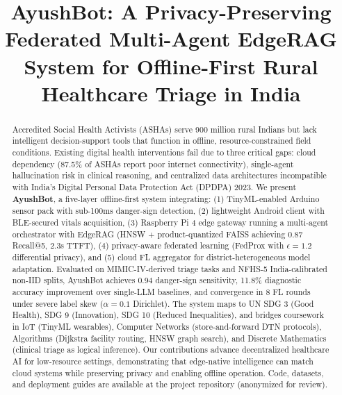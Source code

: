 \documentclass[conference,compsoc]{IEEEtran}
\begin{document}
\title{AyushBot: A Privacy-Preserving Federated Multi-Agent EdgeRAG System for Offline-First Rural Healthcare Triage in India}

\author{
}

\maketitle

\begin{abstract}
Accredited Social Health Activists (ASHAs) serve 900 million rural Indians but lack intelligent decision-support tools that function in offline, resource-constrained field conditions. Existing digital health interventions fail due to three critical gaps: cloud dependency (87.5\% of ASHAs report poor internet connectivity), single-agent hallucination risk in clinical reasoning, and centralized data architectures incompatible with India's Digital Personal Data Protection Act (DPDPA) 2023. We present \textbf{AyushBot}, a five-layer offline-first system integrating: (1) TinyML-enabled Arduino sensor pack with sub-100ms danger-sign detection, (2) lightweight Android client with BLE-secured vitals acquisition, (3) Raspberry Pi 4 edge gateway running a multi-agent orchestrator with EdgeRAG (HNSW + product-quantized FAISS achieving 0.87 Recall@5, 2.3s TTFT), (4) privacy-aware federated learning (FedProx with \(\epsilon = 1.2\) differential privacy), and (5) cloud FL aggregator for district-heterogeneous model adaptation. Evaluated on MIMIC-IV-derived triage tasks and NFHS-5 India-calibrated non-IID splits, AyushBot achieves 0.94 danger-sign sensitivity, 11.8\% diagnostic accuracy improvement over single-LLM baselines, and convergence in 8 FL rounds under severe label skew (\(\alpha = 0.1\) Dirichlet). The system maps to UN SDG 3 (Good Health), SDG 9 (Innovation), SDG 10 (Reduced Inequalities), and bridges coursework in IoT (TinyML wearables), Computer Networks (store-and-forward DTN protocols), Algorithms (Dijkstra facility routing, HNSW graph search), and Discrete Mathematics (clinical triage as logical inference). Our contributions advance decentralized healthcare AI for low-resource settings, demonstrating that edge-native intelligence can match cloud systems while preserving privacy and enabling offline operation. Code, datasets, and deployment guides are available at the project repository (anonymized for review).
\end{abstract}
\end{document}
